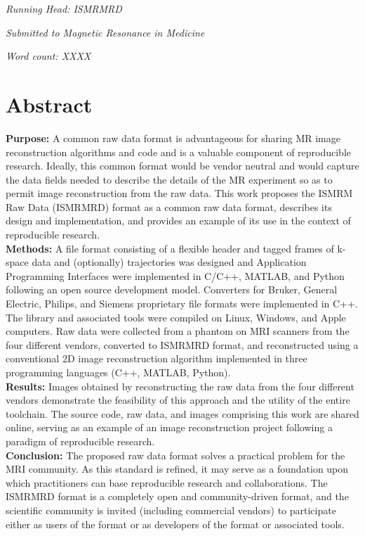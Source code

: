 \documentclass[12pt]{article}
\begin{document}
\textit{Running Head:  ISMRMRD}

\vspace{2mm}

\textit{Submitted to Magnetic Resonance in Medicine} 

\vspace{2mm}

\textit{Word count: XXXX} %


\newpage
\clearpage
{} %
\pagestyle{fancy}
\doublespacing
\section*{Abstract}
\textbf{Purpose:} A common raw data format is advantageous for sharing MR image reconstruction algorithms and code and is a valuable component of reproducible research.  Ideally, this common format would be vendor neutral and would capture the data fields needed to describe the details of the MR experiment so as to permit image reconstruction from the raw data.  This work proposes the ISMRM Raw Data (ISMRMRD) format as a common raw data format, describes its design and implementation, and provides an example of its use in the context of reproducible research.\\
\textbf{Methods:} A file format consisting of a flexible header and tagged frames of k-space data and (optionally) trajectories was designed and  Application Programming Interfaces were implemented in C/C++, MATLAB, and Python following an open source development model.  Converters for Bruker, General Electric, Philips, and Siemens proprietary file formats were implemented in C++. The library and associated tools were compiled on Linux, Windows, and Apple computers. Raw data were collected from a phantom on MRI scanners from the four different vendors, converted to ISMRMRD format, and reconstructed using a conventional 2D image reconstruction algorithm implemented in three programming languages (C++, MATLAB, Python).\\
\textbf{Results:} Images obtained by reconstructing the raw data from the four different vendors demonstrate the feasibility of this approach and the utility of the entire toolchain.  The source code, raw data, and images comprising this work are shared online, serving as an example of an image reconstruction project following a paradigm of reproducible research.\\
\textbf{Conclusion:} The proposed raw data format solves a practical problem
for the MRI community.  As this standard is refined, it may serve as a foundation upon which practitioners can base reproducible research and collaborations.  The ISMRMRD format is a completely open and community-driven format, and the scientific community is invited (including commercial vendors) to participate either as users of the format or as developers of the format or associated tools.
\end{document}
